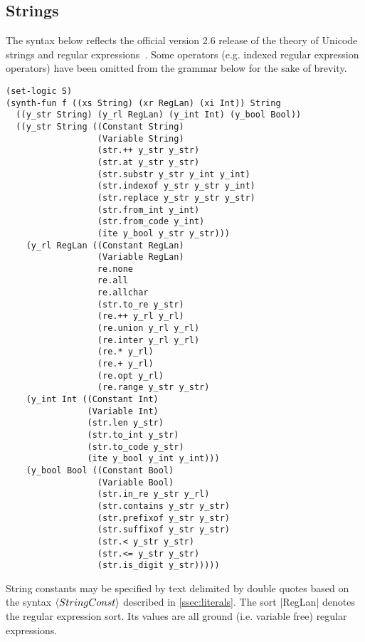 \documentclass[english,a4paper,10pt]{article}
\begin{document}
\begin{appendix}
\subsection{Strings}

The syntax below reflects the official version 2.6 release of the theory
of Unicode strings and regular expressions~\cite{BarFT-RR-17}.
Some operators (e.g. indexed regular expression operators)
have been omitted from the grammar below for the sake of brevity.
\begin{lstlisting}[language=SyGuS]
(set-logic S)
(synth-fun f ((xs String) (xr RegLan) (xi Int)) String
  ((y_str String) (y_rl RegLan) (y_int Int) (y_bool Bool))
  ((y_str String ((Constant String)
                  (Variable String)
                  (str.++ y_str y_str)
                  (str.at y_str y_str)
                  (str.substr y_str y_int y_int)
                  (str.indexof y_str y_str y_int)
                  (str.replace y_str y_str y_str)
                  (str.from_int y_int)
                  (str.from_code y_int)
                  (ite y_bool y_str y_str)))
    (y_rl RegLan ((Constant RegLan)
                  (Variable RegLan)
                  re.none
                  re.all
                  re.allchar
                  (str.to_re y_str)
                  (re.++ y_rl y_rl)
                  (re.union y_rl y_rl)
                  (re.inter y_rl y_rl)
                  (re.* y_rl)
                  (re.+ y_rl)
                  (re.opt y_rl)
                  (re.range y_str y_str)
    (y_int Int ((Constant Int)
                (Variable Int)
                (str.len y_str)
                (str.to_int y_str)
                (str.to_code y_str)
                (ite y_bool y_int y_int)))
    (y_bool Bool ((Constant Bool)
                  (Variable Bool)
                  (str.in_re y_str y_rl)
                  (str.contains y_str y_str)
                  (str.prefixof y_str y_str)
                  (str.suffixof y_str y_str)
                  (str.< y_str y_str)
                  (str.<= y_str y_str)
                  (str.is_digit y_str)))))
\end{lstlisting}
String constants may be specified by text delimited by double quotes
based on the syntax $\left\langle StringConst\right\rangle$ described in \cref{ssec:literals}.
The sort \code|RegLan| denotes the regular expression sort.
Its values are all ground (i.e. variable free) regular expressions.


\end{appendix}
\end{document}

